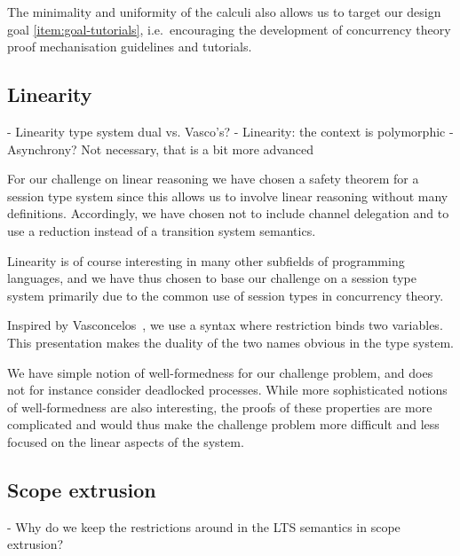 \documentclass[runningheads]{llncs}
\begin{document}
The minimality and uniformity of the calculi also allows us to target our
design goal \ref{item:goal-tutorials}, i.e.~encouraging the development of
concurrency theory proof mechanisation guidelines and tutorials.



\subsection{Linearity}
- Linearity type system dual vs. Vasco's?
- Linearity: the context is polymorphic
- Asynchrony? Not necessary, that is a bit more advanced

For our challenge on linear reasoning we have chosen a safety theorem
for a session type system since this allows us to involve linear
reasoning without many definitions. Accordingly, we have chosen not to
include channel delegation and to use a reduction instead of a
transition system semantics.

Linearity is of course interesting in many other subfields of programming languages, and we have thus chosen to base our challenge on a  session type system primarily due to the common use of session types in concurrency theory.

Inspired by Vasconcelos~\cite{Vasconcelos2012}, we use a syntax where
restriction binds two variables. This presentation makes the duality
of the two names obvious in the type system.

We have simple notion of well-formedness for our challenge problem,
and does not for instance consider deadlocked processes. While more
sophisticated notions of well-formedness are also interesting, the
proofs of these properties are more complicated and would thus make
the challenge problem more difficult and less focused on the linear
aspects of the system.

\subsection{Scope extrusion}
- Why do we keep the restrictions around in the LTS semantics in scope extrusion?
\end{document}
